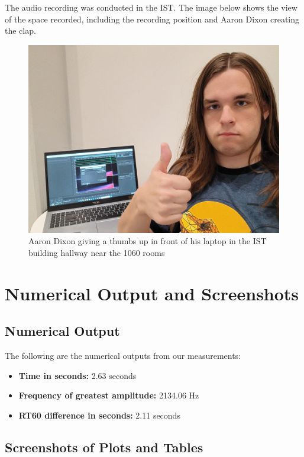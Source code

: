 \documentclass[11pt]{article}
\begin{document}
The audio recording was conducted in the IST. The image below shows the view of the space recorded, including the 
recording position and Aaron Dixon creating the clap.

\begin{figure}[h!]
    \centering
    \includegraphics[width=\textwidth]{aaronDixonPic.jpg}
    \caption{Aaron Dixon giving a thumbs up in front of his laptop in the IST building hallway near the 1060 rooms}
\end{figure}

\section{Numerical Output and Screenshots}

\subsection{Numerical Output}
The following are the numerical outputs from our measurements:

\begin{itemize}
    \item \textbf{Time in seconds:} 2.63 seconds
    \item \textbf{Frequency of greatest amplitude:} 2134.06 Hz
    \item \textbf{RT60 difference in seconds:} 2.11 seconds
\end{itemize}

\subsection{Screenshots of Plots and Tables}
\end{document}
